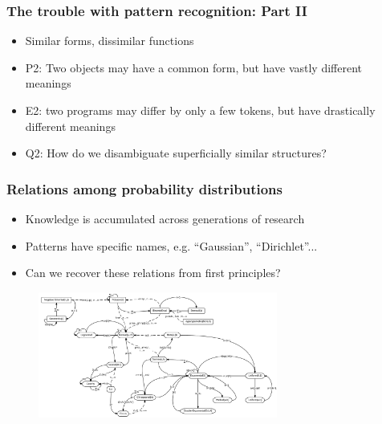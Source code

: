 \documentclass{beamer}
\begin{document}
  \begin{frame}
    \frametitle{The trouble with pattern recognition: Part II}
    \begin{itemize}
      \item Similar forms, dissimilar functions
      \item P2: Two objects may have a common form, but have vastly different meanings
      \item E2: two programs may differ by only a few tokens, but have drastically different meanings
      \item Q2: How do we disambiguate superficially similar structures?
    \end{itemize}
  \end{frame}

  \begin{frame}
    \frametitle{Relations among probability distributions}
    \begin{itemize}
      \item Knowledge is accumulated across generations of research
      \item Patterns have specific names, e.g. ``Gaussian'', ``Dirichlet''...
      \item Can we recover these relations from first principles?
    \end{itemize}
    \begin{figure}[H]
      \centering
      \includegraphics[width=0.7\textwidth]{../clipart/distribution_relations.jpeg}
    \end{figure}
  \end{frame}
\end{document}
